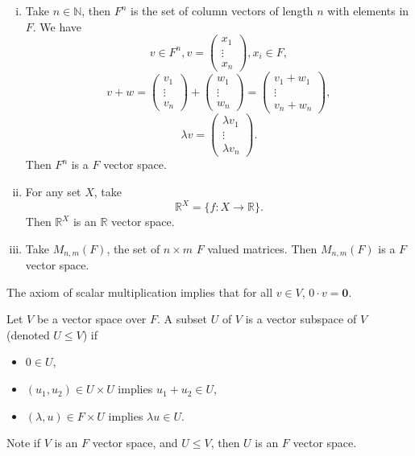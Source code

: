 \documentclass[12pt]{article}
\begin{document}
\begin{exbox}
	\begin{enumerate}[(i)]
		\item Take $n \in \mathbb{N}$, then $F^{n}$ is the set of column vectors of length $n$ with elements in $F$. We have
			\[
			v \in F^{n}, v =
			\begin{pmatrix}
				x_1 \\
				\vdots \\
				x_n
			\end{pmatrix}
			, x_i \in F
			,\]
			\[
			v + w =
			\begin{pmatrix}
				v_1 \\
				\vdots \\
				v_n
			\end{pmatrix}
			+
			\begin{pmatrix}
				w_1 \\
				\vdots \\
				w_n
			\end{pmatrix}
			=
			\begin{pmatrix}
				v_1 + w_1 \\
				\vdots \\
				v_n + w_n
			\end{pmatrix}
			,\]
			\[
			\lambda v =
			\begin{pmatrix}
				\lambda v_1 \\
				\vdots \\
				\lambda v_n
			\end{pmatrix}
			.\]
			Then $F^{n}$ is a $F$ vector space.
		\item For any set $X$, take
			\[
				\mathbb{R}^{X} = \{f : X \to \mathbb{R}\}
			.\]
			Then $\mathbb{R}^{X}$ is an $\mathbb{R}$ vector space.
		\item Take $M_{n, m}(F)$, the set of $n \times m$ $F$ valued matrices. Then $M_{n, m}(F)$ is a $F$ vector space.
\end{enumerate}
\end{exbox}

\begin{remark}
	The axiom of scalar multiplication implies that for all $v \in V$, $0 \cdot v = \mathbf{0}$.
\end{remark}

\begin{definition}[Subspace]
	Let $V$ be a vector space over $F$. A subset $U$ of $V$ is a vector subspace of $V$ (denoted $U \leq V$) if
	\begin{itemize}
		\item $0 \in U$,
		\item $(u_1, u_2) \in U \times U$ implies $u_1 + u_2 \in U$,
		\item $(\lambda, u) \in F \times U$ implies $\lambda u \in U$.
	\end{itemize}
\end{definition}
Note if $V$ is an $F$ vector space, and $U \leq V$, then $U$ is an $F$ vector space.
\end{document}
